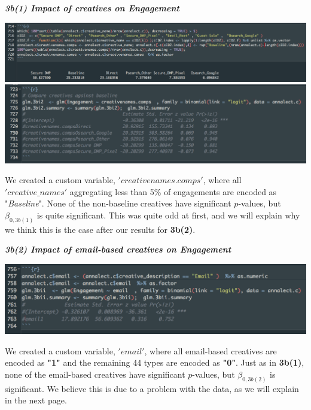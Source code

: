 \documentclass[10pt, oneside,spanish]{article}
\begin{document}
\textbf{\textit{3b(1) Impact of creatives on Engagement}}
\begin{center}
\includegraphics[width=14cm]{3bi1.png}
\includegraphics[width=14cm]{3bi2.png}
\end{center}
We created a custom variable, $'creativenames.comps'$, where all $'creative\_names'$ aggregating less than 5\% of engagements are encoded as "\textit{Baseline}". None of the non-baseline creatives have significant $p$-values, but $\beta_{0,3b(1)}$ is quite significant. This was quite odd at first, and we will explain why we think this is the case after our results for \textbf{3b(2)}.
\medskip

\textbf{\textit{3b(2) Impact of email-based creatives on Engagement}}
\begin{center}
\includegraphics[width=14cm]{3bii1.png}
\end{center}
We created a custom variable, $'email'$, where all email-based creatives are encoded as \textbf{"1"} and the remaining 44 types are encoded as \textbf{"0"}. Just as in \textbf{3b(1)}, none of the email-based creatives have significant $p$-values, but $\beta_{0,3b(2)}$ is significant. We believe this is due to a problem with the data, as we will explain in the next page.
\end{document}
